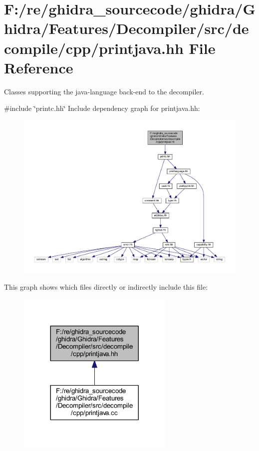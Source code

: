 \hypertarget{printjava_8hh}{}\section{F\+:/re/ghidra\+\_\+sourcecode/ghidra/\+Ghidra/\+Features/\+Decompiler/src/decompile/cpp/printjava.hh File Reference}
\label{printjava_8hh}


Classes supporting the java-\/language back-\/end to the decompiler.  


{\ttfamily \#include \char`\"{}printc.\+hh\char`\"{}}\newline
Include dependency graph for printjava.\+hh\+:
\nopagebreak
\begin{figure}[H]
\begin{center}
\leavevmode
\includegraphics[width=350pt]{printjava_8hh__incl}
\end{center}
\end{figure}
This graph shows which files directly or indirectly include this file\+:
\nopagebreak
\begin{figure}[H]
\begin{center}
\leavevmode
\includegraphics[width=212pt]{printjava_8hh__dep__incl}
\end{center}
\end{figure}

